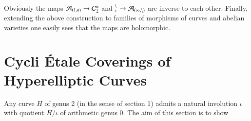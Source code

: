 Obviously the maps $\mathcal{A}_{(1,n)}\rightarrow \mathcal{C}_{2}^{n}$ and $\cal_{2}^{n} \rightarrow \mathcal{A}_{(1,n)}$ are inverse to each other. Finally, extending the above construction to families of morphisms of curves and abelian varieties one easily sees that the maps are holomorphic.

\section{Cycli \'Etale Coverings of Hyperelliptic Curves}\label{art11-sec-2}

Any curve $H$ of genus 2 (in the sense of section 1) admits a natural involution $\iota$ with quotient $H/\iota$ of arithmetic genus 0. The aim of this section is to show
